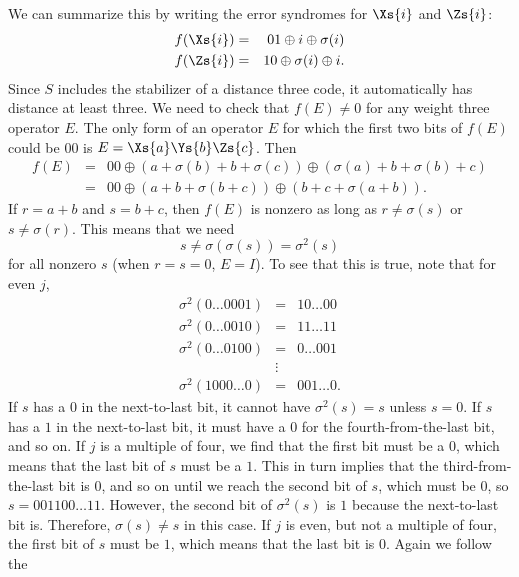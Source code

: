 We can summarize this by writing the error syndromes for $\Xs{i}$ and
$\Zs{i}$:
\begin{eqnarray}
	f (\Xs{i}) & = & 01 \oplus i \oplus \sigma (i) \\
	f (\Zs{i}) & = & 10 \oplus \sigma (i) \oplus i.
\end{eqnarray}
Since $S$ includes the stabilizer of a distance three code, it automatically
has distance at least three.  We need to check that $f(E) \neq 0$ for any
weight three operator $E$.  The only form of an operator $E$ for which the
first two bits of $f(E)$ could be $00$ is $E = \Xs{a} \Ys{b} \Zs{c}$.  Then
\begin{eqnarray}
	f (E) & = & 00 \oplus (a + \sigma (b) + b + \sigma (c) ) \oplus (\sigma (a) +
	b + \sigma (b) + c) \\
	& = & 00 \oplus (a+b + \sigma (b+c) ) \oplus (b+c + \sigma (a+b) ).
\end{eqnarray}
If $r = a+b$ and $s = b+c$, then $f(E)$ is nonzero as long as $r \neq
\sigma (s)$ or $s \neq \sigma (r)$.  This means that we need
\begin{equation}
	s \neq \sigma (\sigma (s)) = \sigma^2 (s)
\end{equation}
for all nonzero $s$ (when $r=s=0$, $E=I$).  To see that this is true, note
that for even $j$,
\begin{eqnarray}
	\sigma^2 (0 \ldots 0 0 0 1) & = & 1 0 \ldots 0 0  \nonumber \\
	\sigma^2 (0 \ldots 0 0 1 0) & = & 1 1 \ldots 1 1 \nonumber \\
	\sigma^2 (0 \ldots 0 1 0 0) & = & 0 \ldots 0 0 1 \\
	& \vdots & \nonumber \\
	\sigma^2 (1 0 0 0 \ldots 0) & = & 0 0 1 \ldots 0. \nonumber
\end{eqnarray}
If $s$ has a $0$ in the next-to-last bit, it cannot have $\sigma^2 (s) = s$
unless $s=0$.  If $s$ has a $1$ in the next-to-last bit, it must have a $0$ for
the fourth-from-the-last bit, and so on.  If $j$ is a multiple of four, we find
that the first bit must be a $0$, which means that the last bit of $s$ must be
a $1$.  This in turn implies that the third-from-the-last bit is $0$, and so on
until we reach the second bit of $s$, which must be $0$, so $s = 0 0 1 1 0 0
\ldots 1 1$.  However, the second bit of $\sigma^2 (s)$ is $1$ because the
next-to-last bit is.  Therefore, $\sigma(s) \neq s$ in this case.
If $j$ is even, but not a multiple of four, the first bit
of $s$ must be $1$, which means that the last bit is $0$.  Again we follow the
